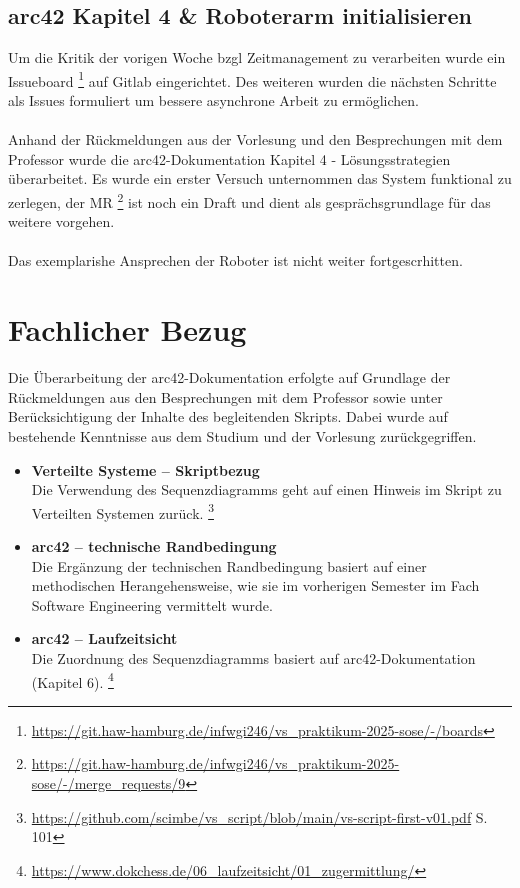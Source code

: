 \documentclass{article}
\begin{document}
\subsection{arc42 Kapitel 4 \& Roboterarm initialisieren} 
Um die Kritik der vorigen Woche bzgl Zeitmanagement zu verarbeiten wurde ein Issueboard
\footnote{\url{https://git.haw-hamburg.de/infwgi246/vs_praktikum-2025-sose/-/boards}}
auf Gitlab eingerichtet. Des weiteren wurden die nächsten Schritte als Issues formuliert 
um bessere asynchrone Arbeit zu ermöglichen. 
\\\\
Anhand der Rückmeldungen aus der Vorlesung und den Besprechungen mit dem Professor wurde die arc42-Dokumentation Kapitel 4 - Lösungsstrategien überarbeitet.
Es wurde ein erster Versuch unternommen das System funktional zu zerlegen, der MR
\footnote{\url{https://git.haw-hamburg.de/infwgi246/vs_praktikum-2025-sose/-/merge_requests/9}}
ist noch ein Draft und dient als gesprächsgrundlage für das weitere vorgehen. 
\\\\
Das exemplarishe Ansprechen der Roboter ist nicht weiter fortgescrhitten.




\section{Fachlicher Bezug}

Die Überarbeitung der arc42-Dokumentation erfolgte auf Grundlage der Rückmeldungen aus den Besprechungen mit dem Professor sowie unter Berücksichtigung der Inhalte des begleitenden Skripts.  
Dabei wurde auf bestehende Kenntnisse aus dem Studium und der Vorlesung zurückgegriffen.

\begin{itemize}

\item \textbf{Verteilte Systeme – Skriptbezug} \\
Die Verwendung des Sequenzdiagramms geht auf einen Hinweis im Skript zu Verteilten Systemen zurück.
\footnote{\url{https://github.com/scimbe/vs_script/blob/main/vs-script-first-v01.pdf} S. 101 }
\item \textbf{arc42 – technische Randbedingung} \\
Die Ergänzung der technischen Randbedingung basiert auf einer methodischen Herangehensweise, wie sie im vorherigen Semester im Fach Software Engineering vermittelt wurde.
\item \textbf{arc42 – Laufzeitsicht} \\
Die Zuordnung des Sequenzdiagramms basiert auf arc42-Dokumentation (Kapitel 6). 
\footnote {\url{https://www.dokchess.de/06_laufzeitsicht/01_zugermittlung/}}


\end{itemize}
\end{document}
